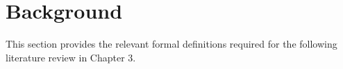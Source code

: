 \section{Background}

This section provides the relevant formal definitions required for the following literature review in Chapter 3. 

